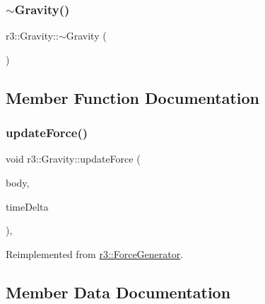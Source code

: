 \mbox{\label{classr3_1_1_gravity_abdf3edf32d08b6c5b9c2fc161635f993}} 
\subsubsection{\texorpdfstring{$\sim$\+Gravity()}{~Gravity()}}
{\footnotesize\ttfamily r3\+::\+Gravity\+::$\sim$\+Gravity (\begin{DoxyParamCaption}{ }\end{DoxyParamCaption})\hspace{0.3cm}{\ttfamily [default]}}



\subsection{Member Function Documentation}
\mbox{\label{classr3_1_1_gravity_ae3152c6a922ffa193aee362e161cd4a9}} 
\subsubsection{\texorpdfstring{update\+Force()}{updateForce()}}
{\footnotesize\ttfamily void r3\+::\+Gravity\+::update\+Force (\begin{DoxyParamCaption}\item[{\mbox{\hyperlink{classr3_1_1_rigid_body}{Rigid\+Body}} $\ast$}]{body,  }\item[{\mbox{\hyperlink{namespacer3_ab2016b3e3f743fb735afce242f0dc1eb}{real}}}]{time\+Delta }\end{DoxyParamCaption})\hspace{0.3cm}{\ttfamily [override]}, {\ttfamily [virtual]}}



Reimplemented from \mbox{\hyperlink{classr3_1_1_force_generator_a16d1e8aa85d574013de859b95944c5bb}{r3\+::\+Force\+Generator}}.



\subsection{Member Data Documentation}
\mbox{\label{classr3_1_1_gravity_a2feb1d84fc4118e6e30b707a7224f6ef}} 
